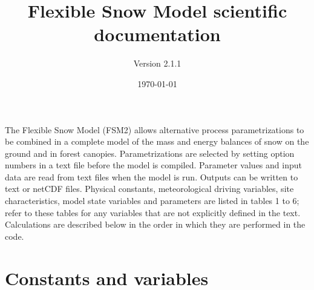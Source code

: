 \documentclass[fleqn]{article}
\title{Flexible Snow Model scientific documentation}
\author{Version 2.1.1}
\date{\today}
\begin{document}
\maketitle

{\parindent 0pt
The Flexible Snow Model (FSM2) allows alternative process parametrizations to be combined in a complete model of the mass and energy balances of snow on the ground and in forest canopies. Parametrizations are selected by setting option numbers in a text file before the model is compiled. Parameter values and input data are read from text files when the model is run. Outputs can be written to text or netCDF files. Physical constants, meteorological driving variables, site characteristics, model state variables and parameters are listed in tables 1 to 6; refer to these tables for any variables that are not explicitly defined in the text. Calculations are described below in the order in which they are performed in the code.
}

\section{Constants and variables}
\end{document}
